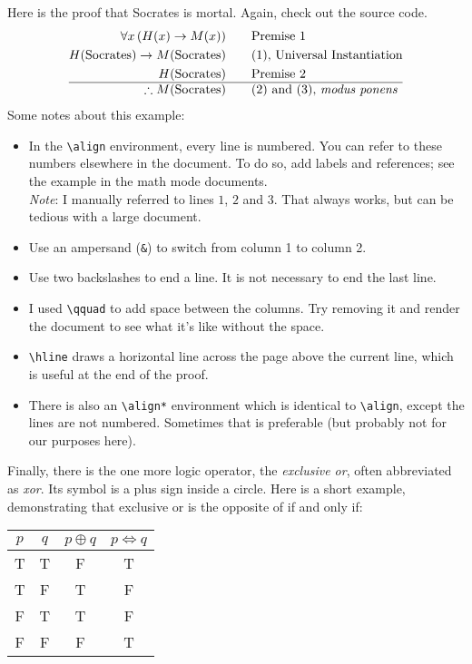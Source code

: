 \documentclass{article}
\begin{document}
Here is the proof that Socrates is mortal. Again, check out the source code.
\begin{align}
  \forall x\,(H(x)\to M(x)) & \qquad\textrm{Premise 1}\\
  H({\rm Socrates})\to M({\rm Socrates}) & \qquad\textrm{(1), Universal
  Instantiation}\\
  H({\rm Socrates}) & \qquad\textrm{Premise 2}\\ \hline
  \therefore M({\rm Socrates}) & \qquad\textrm{(2) and (3), \emph{modus ponens}}
\end{align}
\newpage
Some notes about this example:
\begin{itemize}
  \item In the {\tt \textbackslash align} environment, every line is numbered.
  You can refer to these numbers elsewhere in the document. To do so, add labels
  and references; see the example in the math mode documents.\\
  \emph{Note}\/: I manually referred to lines $1$, $2$ and $3$. That always
  works, but can be tedious with a large document.
  \item Use an ampersand ({\tt \&}) to switch from column 1 to column 2.
  \item Use two backslashes to end a line. It is not necessary to end the last
  line.
  \item I used {\tt \textbackslash qquad} to add space between the columns. Try
  removing it and render the document to see what it's like without the space.
  \item {\tt \textbackslash hline} draws a horizontal line across the page above
  the current line, which is useful at the end of the proof.
  \item There is also an {\tt \textbackslash align*} environment which is
  identical to {\tt \textbackslash align}, except the lines are not numbered.
  Sometimes that is preferable (but probably not for our purposes here).
\end{itemize}

Finally, there is the one more logic operator, the \emph{exclusive or}, often
abbreviated as \emph{xor}. Its symbol is a plus sign inside a circle. Here is a
short example, demonstrating that exclusive or is the opposite of if and only
if:
\vskip12pt

\begin{tabular}{|c|c||c|c|}
  \hline
  $p$ & $q$ & $p\oplus q$ & $p\iff q$\\ \hline\hline
  T & T & F & T\\ \hline
  T & F & T & F\\ \hline
  F & T & T & F\\ \hline
  F & F & F & T\\ \hline
\end{tabular}
\end{document}
